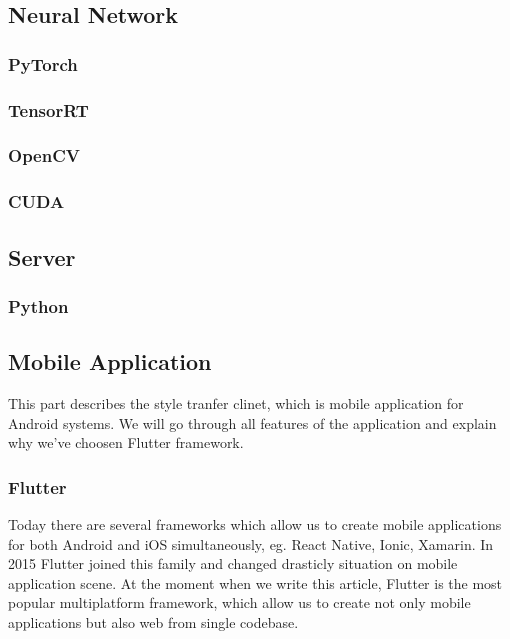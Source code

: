 \documentclass[../Main.tex]{subfiles}
\begin{document}
\subsection{Neural Network}
    \subsubsection{PyTorch}
    \subsubsection{TensorRT}
    \subsubsection{OpenCV}
    \subsubsection{CUDA}
    
\subsection{Server}
    \subsubsection{Python}

\subsection{Mobile Application}
    This part describes the style tranfer clinet, which is mobile application 
    for Android systems. We will go through all features of the application and
    explain why we've choosen Flutter framework. 
    \subsubsection{Flutter}
        Today there are several frameworks which allow us to create mobile 
        applications for both Android and iOS simultaneously, 
        eg. React Native, Ionic, Xamarin.
        In 2015 Flutter joined this family and changed drasticly situation
        on mobile application scene. At the moment when we write this article,
        Flutter is the most popular multiplatform framework, which allow us to 
        create not only mobile applications but also web from single codebase.
    
\end{document}

